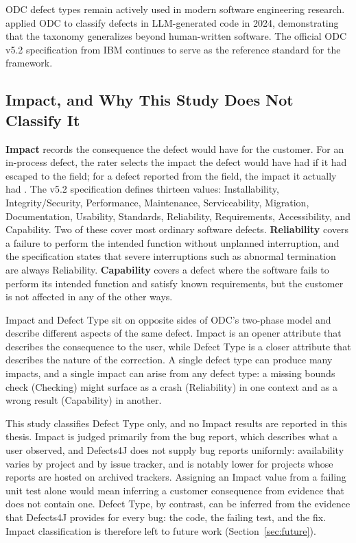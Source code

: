 \documentclass{iutbscthesis}
\begin{document}
ODC defect types remain actively used in modern software engineering research. \textcite{esfahani2024understanding} applied ODC to classify defects in LLM-generated code in 2024, demonstrating that the taxonomy generalizes beyond human-written software. The official ODC v5.2 specification from IBM \cite{ibm2013odc} continues to serve as the reference standard for the framework.

\subsection{Impact, and Why This Study Does Not Classify It}
\label{sec:impact}

\textbf{Impact} records the consequence the defect would have for the customer. For an in-process defect, the rater selects the impact the defect would have had if it had escaped to the field; for a defect reported from the field, the impact it actually had \cite{ibm2013odc}. The v5.2 specification defines thirteen values: Installability, Integrity/Security, Performance, Maintenance, Serviceability, Migration, Documentation, Usability, Standards, Reliability, Requirements, Accessibility, and Capability. Two of these cover most ordinary software defects. \textbf{Reliability} covers a failure to perform the intended function without unplanned interruption, and the specification states that severe interruptions such as abnormal termination are always Reliability. \textbf{Capability} covers a defect where the software fails to perform its intended function and satisfy known requirements, but the customer is not affected in any of the other ways.

Impact and Defect Type sit on opposite sides of ODC's two-phase model and describe different aspects of the same defect. Impact is an opener attribute that describes the consequence to the user, while Defect Type is a closer attribute that describes the nature of the correction. A single defect type can produce many impacts, and a single impact can arise from any defect type: a missing bounds check (Checking) might surface as a crash (Reliability) in one context and as a wrong result (Capability) in another.

This study classifies Defect Type only, and no Impact results are reported in this thesis. Impact is judged primarily from the bug report, which describes what a user observed, and Defects4J does not supply bug reports uniformly: availability varies by project and by issue tracker, and is notably lower for projects whose reports are hosted on archived trackers. Assigning an Impact value from a failing unit test alone would mean inferring a customer consequence from evidence that does not contain one. Defect Type, by contrast, can be inferred from the evidence that Defects4J provides for every bug: the code, the failing test, and the fix. Impact classification is therefore left to future work (Section~\ref{sec:future}).
\end{document}
